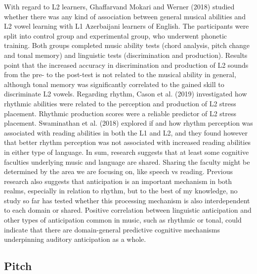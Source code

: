 \documentclass[english,man]{apa6}
\begin{document}
With regard to L2 learners, Ghaffarvand Mokari and Werner (2018) studied whether there was any kind of association between general musical abilities and L2 vowel learning with L1 Azerbaijani learners of English. The participants were split into control group and experimental group, who underwent phonetic training. Both groups completed music ability tests (chord analysis, pitch change and tonal memory) and linguistic tests (discrimination and production). Results point that the increased accuracy in discrimination and production of L2 sounds from the pre- to the post-test is not related to the musical ability in general, although tonal memory was significantly correlated to the gained skill to discriminate L2 vowels. Regarding rhythm, Cason et al. (2019) investigated how rhythmic abilities were related to the perception and production of L2 stress placement. Rhythmic production scores were a reliable predictor of L2 stress placement. Swaminathan et al. (2018) explored if and how rhythm perception was associated with reading abilities in both the L1 and L2, and they found however that better rhythm perception was not associated with increased reading abilities in either type of language.
In sum, research suggests that at least some cognitive faculties underlying music and language are shared. Sharing the faculty might be determined by the area we are focusing on, like speech vs reading. Previous research also suggests that anticipation is an important mechanism in both realms, especially in relation to rhythm, but to the best of my knowledge, no study so far has tested whether this processing mechanism is also interdependent to each domain or shared. Positive correlation between linguistic anticipation and other types of anticipation common in music, such as rhythmic or tonal, could indicate that there are domain-general predictive cognitive mechanisms underpinning auditory anticipation as a whole.

\hypertarget{pitch}{%
\subsection{Pitch}\label{pitch}}
\end{document}
